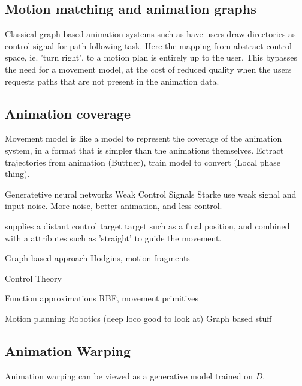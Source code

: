 \subsection{Motion matching and animation graphs}
Classical graph based animation systems such as \citep{treuille07} have users draw directories as control signal for path following task. Here the mapping from abstract control space, ie. 'turn right', to a motion plan is entirely up to the user. This bypasses the need for a movement model, at the cost of reduced quality when the users requests paths that are not present in the animation data.

\subsection{Animation coverage}
Movement model is like a model to represent the coverage of the animation system, in a format that is simpler than the animations themselves. Ectract trajectories from animation (Buttner), train model to convert (Local phase thing). 



Generatetive neural networks Weak Control Signals
    Starke use weak signal and input noise. More noise, better animation, and less control.

    \citep{lee18} supplies a distant control target target such as a final position, and combined with a attributes such as 'straight' to guide the movement.

Graph based approach 
    Hodgins, motion fragments

Control Theory

Function approximations 
    RBF, movement primitives

Motion planning
    Robotics (deep loco good to look at)
    Graph based stuff



\subsection{Animation Warping}
Animation warping can be viewed as a generative model trained on $D$. 

